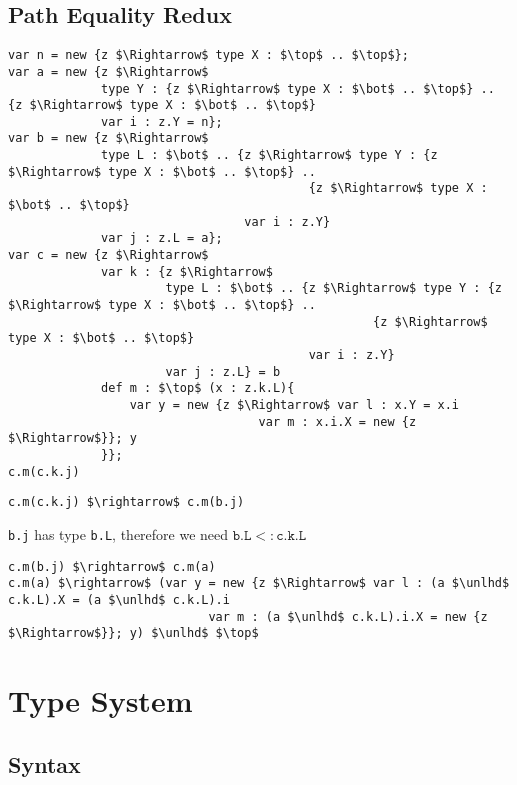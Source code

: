 \documentclass{llncs}
\begin{document}
\subsection{Path Equality Redux}
\begin{lstlisting}[mathescape, style=custom_lang]
var n = new {z $\Rightarrow$ type X : $\top$ .. $\top$};
var a = new {z $\Rightarrow$
             type Y : {z $\Rightarrow$ type X : $\bot$ .. $\top$} .. {z $\Rightarrow$ type X : $\bot$ .. $\top$}
             var i : z.Y = n};
var b = new {z $\Rightarrow$
             type L : $\bot$ .. {z $\Rightarrow$ type Y : {z $\Rightarrow$ type X : $\bot$ .. $\top$} .. 
                                          {z $\Rightarrow$ type X : $\bot$ .. $\top$}
                                 var i : z.Y}
             var j : z.L = a};
var c = new {z $\Rightarrow$
             var k : {z $\Rightarrow$
                      type L : $\bot$ .. {z $\Rightarrow$ type Y : {z $\Rightarrow$ type X : $\bot$ .. $\top$} .. 
                                                   {z $\Rightarrow$ type X : $\bot$ .. $\top$}
                                          var i : z.Y}
                      var j : z.L} = b
             def m : $\top$ (x : z.k.L){
                 var y = new {z $\Rightarrow$ var l : x.Y = x.i
                                   var m : x.i.X = new {z $\Rightarrow$}}; y
             }};
c.m(c.k.j)
\end{lstlisting}
\begin{lstlisting}[mathescape, style=custom_lang]
c.m(c.k.j) $\rightarrow$ c.m(b.j)
\end{lstlisting} 
\texttt{b.j} has type \texttt{b.L}, therefore we need 
$\texttt{b.L} <: \texttt{c.k.L}$
\begin{lstlisting}[mathescape, style=custom_lang]
c.m(b.j) $\rightarrow$ c.m(a)
c.m(a) $\rightarrow$ (var y = new {z $\Rightarrow$ var l : (a $\unlhd$ c.k.L).X = (a $\unlhd$ c.k.L).i 
                            var m : (a $\unlhd$ c.k.L).i.X = new {z $\Rightarrow$}}; y) $\unlhd$ $\top$
\end{lstlisting}
\section{Type System}
	\label{s:type_sys}


\subsection{Syntax}
\end{document}
